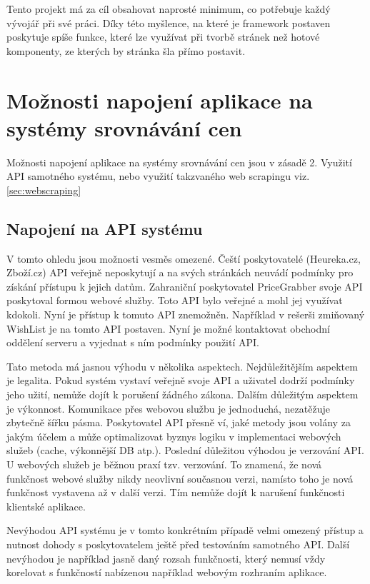 Tento projekt má za cíl obsahovat naprosté minimum, co potřebuje každý vývojář při své práci\cite{website:boilerplate-history}. Díky této myšlence, na které je framework postaven poskytuje spíše funkce, které lze využívat při tvorbě stránek než hotové komponenty, ze kterých by stránka šla přímo postavit.

\section{Možnosti napojení aplikace na systémy srovnávání cen}
Možnosti napojení aplikace na systémy srovnávání cen jsou v zásadě 2. Využití API samotného systému, nebo využití takzvaného web scrapingu viz. \ref{sec:webscraping}

\subsection{Napojení na API systému}
V tomto ohledu jsou možnosti vesměs omezené. Čeští poskytovatelé (Heureka.cz, Zboží.cz) API veřejně neposkytují a na svých stránkách neuvádí podmínky pro získání přístupu k jejich datům. Zahraniční poskytovatel PriceGrabber svoje API poskytoval formou webové služby. Toto API bylo veřejné a mohl jej využívat kdokoli. Nyní je přístup k tomuto API znemožněn\cite{website:pricegrabber-api}. Například v rešerši zmiňovaný WishList je na tomto API postaven. Nyní je možné kontaktovat obchodní oddělení serveru a vyjednat s ním podmínky použití API.

Tato metoda má jasnou výhodu v několika aspektech. Nejdůležitějším aspektem je legalita. Pokud systém vystaví veřejně svoje API a uživatel dodrží podmínky jeho užití, nemůže dojít k porušení žádného zákona. Dalším důležitým aspektem je výkonnost. Komunikace přes webovou službu je jednoduchá, nezatěžuje zbytečně šířku pásma. Poskytovatel API přesně ví, jaké metody jsou volány za jakým účelem a může optimalizovat byznys logiku v implementaci webových služeb (cache, výkonnější DB atp.). Poslední důležitou výhodou je verzování API. U webových služeb je běžnou praxí tzv. verzování\cite{josuttis2007soa}. To znamená, že nová funkčnost webové služby nikdy neovlivní současnou verzi, namísto toho je nová funkčnost vystavena až v další verzi. Tím nemůže dojít k narušení funkčnosti klientské aplikace.

Nevýhodou API systému je v tomto konkrétním případě velmi omezený přístup a nutnost dohody s poskytovatelem ještě před testováním samotného API. Další nevýhodou je například jasně daný rozsah funkčnosti, který nemusí vždy korelovat s funkčností nabízenou například webovým rozhraním aplikace.

